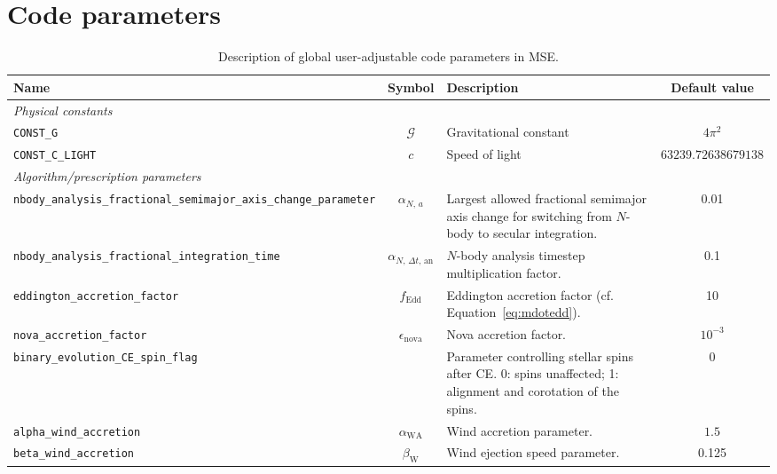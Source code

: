 \documentclass[a4paper,11pt]{article}
\newcommand{\WA}{\mathrm{WA}}
\newcommand{\mse}{\textsc{MSE}}
\newcommand{\eq}{Equation}
\newcommand{\gconst}{\mathcal{G}}
\begin{document}
\section{Code parameters}

\begin{table}
\begin{tabular}{p{6.0cm}cp{4.0cm}c}
\toprule
Name & Symbol & Description & Default value \\
\midrule
{\it Physical constants} \\
\texttt{CONST\_G} & $\gconst$ & Gravitational constant & $4\pi^2$	\\
\texttt{CONST\_C\_LIGHT} & $c$ & Speed of light& $63239.72638679138$	\\
\midrule
{\it Algorithm/prescription parameters} \\
\texttt{nbody\_analysis\_fractional\newline \_semimajor\_axis\_change\_parameter} & $\alpha_{N,\,a}$			& Largest allowed fractional semimajor axis change for switching from $N$-body to secular integration.		& 0.01 \\
\texttt{nbody\_analysis\_fractional\newline \_integration\_time} & $\alpha_{N,\,\Delta t,\,\mathrm{an}} $& $N$-body analysis timestep multiplication factor.					& 0.1 \\
\texttt{eddington\_accretion\_factor} & $f_\mathrm{Edd}$			& Eddington accretion factor (cf. \eq~\ref{eq:mdotedd}).					& 10  \\
\texttt{nova\_accretion\_factor} & $ \epsilon_{\mathrm{nova}}$	& Nova accretion factor.											& $10^{-3}$  \\
\texttt{binary\_evolution\_CE\_spin\_flag} & & Parameter controlling stellar spins after CE. 0: spins unaffected; 1: alignment and corotation of the spins. & 0 \\ 
\texttt{alpha\_wind\_accretion} & $\alpha_\WA$ & Wind accretion parameter. & $1.5$ \\
\texttt{beta\_wind\_accretion} & $\beta_\mathrm{W}$ & Wind ejection speed parameter. & 0.125 \\
\bottomrule
\end{tabular}
\caption{Description of global user-adjustable code parameters in \mse. }
\label{table:par_glob}
\end{table}
\end{document}
